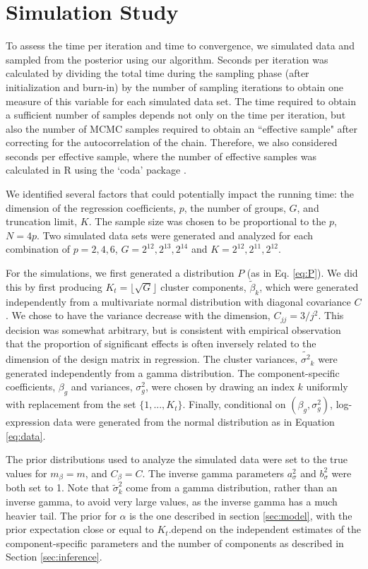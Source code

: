 {\section{Simulation Study}
\label{sec:timing}
To assess the time per iteration and time to convergence, we simulated data and sampled from the posterior using our algorithm. Seconds per iteration was calculated by dividing the total time during the sampling phase (after initialization and burn-in) by the number of sampling iterations to obtain one measure of this variable for each simulated data set. The time required to obtain a sufficient number of samples depends not only on the time per iteration, but also the number of MCMC samples required to obtain an ``effective sample" after correcting for the autocorrelation of the chain. Therefore, we also considered seconds per effective sample, where the number of effective samples was calculated in R using the `coda' package \cite{plummer}.

We identified several factors that could potentially impact the running time: the dimension of the regression coefficients, $p$, the number of groups, $G$, and truncation limit, $K$. The sample size was chosen to be proportional to the $p$, $N=4p$. Two simulated data sets were generated and analyzed for each combination of $p=2,4,6$, $G=2^12,2^13,2^14$ and $K=2^12,2^11,2^12$.

For the simulations, we first generated a distribution $P$ (as in Eq. \ref{eq:P}). We did this by first producing $K_t=\lfloor \sqrt{G}\rfloor$ cluster components, $\tilde{\beta}_k$, which were generated independently from a multivariate normal distribution with diagonal covariance $C$. We chose to have the variance decrease with the dimension, $C_{jj} = 3/j^2$. This decision was somewhat arbitrary, but is consistent with empirical observation that the proportion of significant effects is often inversely related to the dimension of the design matrix in regression. The cluster variances, $\tilde{\sigma^2}_k$ were generated independently from a gamma distribution. The component-specific coefficients, $\beta_g$ and variances, $\sigma^2_g$, were chosen by drawing an index $k$ uniformly with replacement from the set $\{1,...,K_t\}$. Finally, conditional on $(\beta_g,\sigma^2_g)$, log-expression data were generated from the normal distribution as in Equation \ref{eq:data}.

The prior distributions used to analyze the simulated data were set to the true values for $m_\beta = m$, and $C_\beta = C$. The inverse gamma parameters $a_\sigma^2$ and $b_\sigma^2$ were both set to 1. Note that $\tilde{\sigma}^2_k$ come from a gamma distribution, rather than an inverse gamma, to avoid very large values, as the inverse gamma has a much heavier tail. The prior for $\alpha$ is the one described in section \ref{sec:model}, with the prior expectation close or equal to $K_t$.depend on the independent estimates of the component-specific parameters and the number of components as described in Section \ref{sec:inference}.

}
